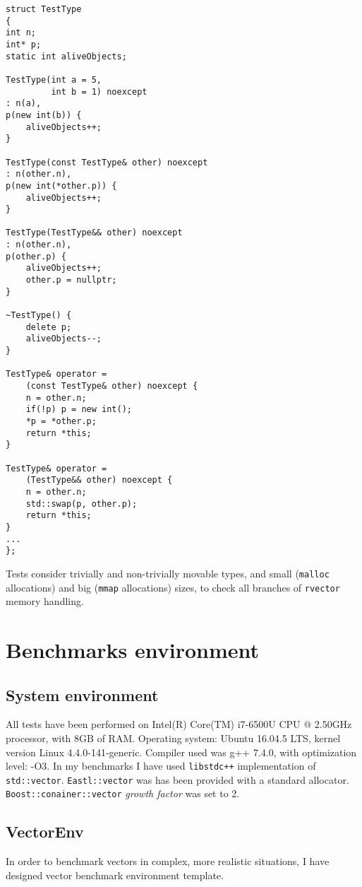 \documentclass[inz, english, shortabstract]{iithesis}
\begin{document}
\begin{lstlisting}[caption=TestType, multicols=2, label=TestType_impl]
struct TestType
{
int n;
int* p;
static int aliveObjects;

TestType(int a = 5, 
		 int b = 1) noexcept
: n(a),
p(new int(b)) {
	aliveObjects++;
}

TestType(const TestType& other) noexcept
: n(other.n),
p(new int(*other.p)) {
	aliveObjects++;
}

TestType(TestType&& other) noexcept
: n(other.n),
p(other.p) {
	aliveObjects++;
	other.p = nullptr;
}

~TestType() {
	delete p;
	aliveObjects--;
}

TestType& operator = 
	(const TestType& other) noexcept {
	n = other.n;
	if(!p) p = new int();
	*p = *other.p;
	return *this;
}

TestType& operator = 
	(TestType&& other) noexcept {
	n = other.n;
	std::swap(p, other.p);
	return *this;
}
...
};
\end{lstlisting}
Tests consider trivially and non-trivially movable types, and small ({\tt malloc} allocations) and big ({\tt mmap} allocations) sizes, to check all branches of {\tt rvector} memory handling.

\chapter{Benchmarks environment}
\section{System environment}
All tests have been performed on Intel(R) Core(TM) i7-6500U CPU @ 2.50GHz processor, with 8GB of RAM. Operating system: Ubuntu 16.04.5 LTS, kernel version Linux 4.4.0-141-generic. Compiler used was g++ 7.4.0, with optimization level: -O3. In my benchmarks I have used {\tt libstdc++} implementation\cite{std::vector_impl} of {\tt std::vector}. {\tt Eastl::vector} was has been provided with a standard allocator. {\tt Boost::conainer::vector} \emph{growth factor} was set to 2. 
\section{VectorEnv}
In order to benchmark vectors in complex, more realistic situations, I have designed vector benchmark environment template.
\end{document}
